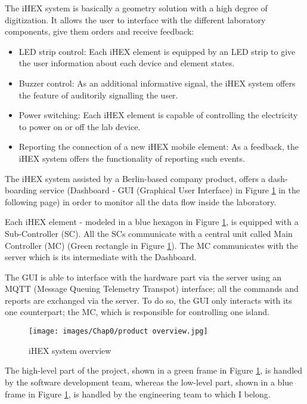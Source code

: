 The iHEX system is basically a geometry solution with a high degree of digitization. It allows the user to interface with the different laboratory components, give them orders and receive feedback:
\begin{itemize}
    \item LED strip control: Each iHEX element is equipped by an LED strip to give the user information about each device and element states.
    \item Buzzer control: As an additional informative signal, the iHEX system offers the feature of auditorily signalling the user.
    \item Power switching: Each iHEX element is capable of controlling the electricity to power on or off the lab device.
    \item Reporting the connection of a new iHEX mobile element: As a feedback, the iHEX system offers the functionality of reporting such events.    
\end{itemize}

The iHEX system assisted by a Berlin-based company product, offers a dash-boarding service (Dashboard - GUI (Graphical User Interface) in Figure \ref{iHEX ooverview} in the following page) in order to monitor all the data flow inside the laboratory.

Each iHEX element - modeled in a blue hexagon in Figure \ref{iHEX ooverview}, is equipped with a Sub-Controller (SC). All the SCs communicate with a central unit called Main Controller (MC) (Green rectangle in Figure \ref{iHEX ooverview}). The MC communicates with the server which is its intermediate with the Dashboard.

The GUI is able to interface with the hardware part via the server using an MQTT (Message Queuing Telemetry Transpot) interface; all the commands and reports are exchanged via the server. To do so, the GUI only interacts with its one counterpart; the MC, which is responsible for controlling one island.

\begin{figure}[H]
\begin{center}
\texttt{[image: images/Chap0/product overview.jpg]}\\
\caption{iHEX system overview}
\label{iHEX ooverview}
\end{center}
\end{figure} 


The high-level part of the project, shown in a green frame in Figure \ref{iHEX ooverview}, is handled by the software development team, whereas the low-level part, shown in a blue frame in Figure \ref{iHEX ooverview}, is handled by the engineering team to which I belong.


